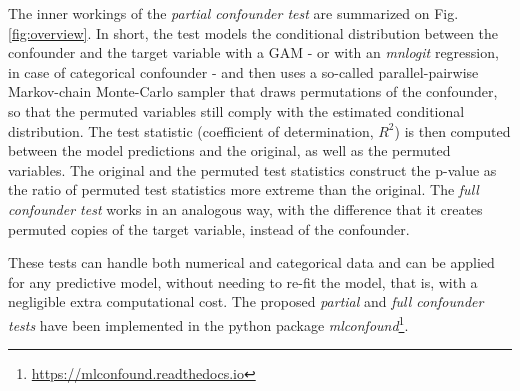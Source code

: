 \documentclass{article}
\begin{document}
The inner workings of the \emph{partial confounder test} are summarized on Fig. \ref{fig:overview}. In short, the test models the conditional distribution between the confounder and the target variable with a GAM - or with an \emph{mnlogit} regression, in case of categorical confounder - and then uses a so-called parallel-pairwise Markov-chain Monte-Carlo sampler\cite{berrett2020conditional} that draws permutations of the confounder, so that the permuted variables still comply with the estimated conditional distribution. The test statistic (coefficient of determination, $R^2$) is then computed between the model predictions and the original, as well as the permuted variables. The original and the permuted test statistics construct the p-value as the ratio of permuted test statistics more extreme than the original. The \emph{full confounder test} works in an analogous way, with the difference that it creates permuted copies of the target variable, instead of the confounder.

These tests can handle both numerical and categorical data and can be applied for any predictive model, without needing to re-fit the model, that is, with a negligible extra computational cost.
The proposed \emph{partial} and \emph{full confounder tests} have been implemented in the python package \emph{mlconfound}\footnote{\href{https://mlconfound.readthedocs.io}{https://mlconfound.readthedocs.io}}. 
\end{document}

